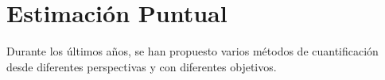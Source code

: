\chapter{Estimación Puntual}

Durante los últimos años, se han propuesto varios métodos de cuantificación
desde diferentes perspectivas y con diferentes objetivos.
